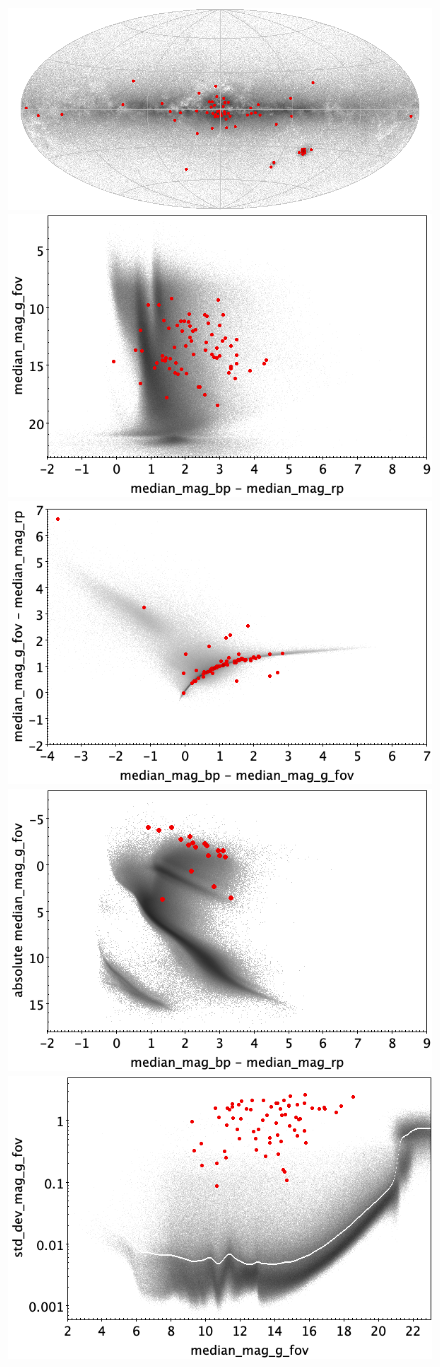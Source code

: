 \documentclass[longauth]{aa}
\begin{document}
\begin{appendix}
\begin{figure}
\centering
{} \includegraphics[width=0.6\hsize]{figures/appendix/RCB_trn_sky.png} \\ %
\vspace{4mm}
 \includegraphics[width=0.45\hsize]{figures/appendix/RCB_trn_cm.png}  %
\hspace{2mm}
 \includegraphics[width=0.45\hsize]{figures/appendix/RCB_trn_cc.png} \\ %
\vspace{4mm}
 \includegraphics[width=0.45\hsize]{figures/appendix/RCB_trn_cam.png}  %
\hspace{2mm}
 \includegraphics[width=0.45\hsize]{figures/appendix/RCB_trn_msd.png} \\ %

\end{figure}
\end{appendix}
\end{document}

